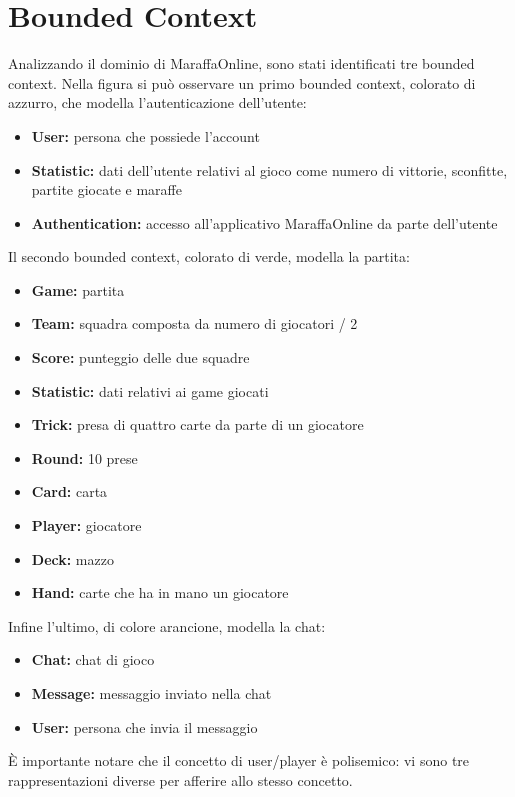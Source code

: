 \section{Bounded Context}
Analizzando il dominio di MaraffaOnline, sono stati identificati tre bounded context.
Nella figura si può osservare un primo bounded context, colorato di azzurro, che modella l'autenticazione dell'utente:
    \begin{itemize}
        \item \textbf{User:} persona che possiede l'account
        \item \textbf{Statistic:} dati dell'utente relativi al gioco come numero di vittorie, sconfitte, partite giocate e maraffe
        \item \textbf{Authentication:} accesso all'applicativo MaraffaOnline da parte dell'utente
    \end{itemize}
Il secondo bounded context, colorato di verde, modella la partita:
    \begin{itemize}
        \item \textbf{Game:} partita
        \item \textbf{Team:} squadra composta da numero di giocatori / 2
        \item \textbf{Score:} punteggio delle due squadre
        \item \textbf{Statistic:} dati relativi ai game giocati
        \item \textbf{Trick:} presa di quattro carte da parte di un giocatore
        \item \textbf{Round:} 10 prese
        \item \textbf{Card:} carta
        \item \textbf{Player:} giocatore
        \item \textbf{Deck:} mazzo
        \item \textbf{Hand:} carte che ha in mano un giocatore
    \end{itemize}
Infine l'ultimo, di colore arancione, modella la chat:
    \begin{itemize}
        \item \textbf{Chat:} chat di gioco
        \item \textbf{Message:} messaggio inviato nella chat
        \item \textbf{User:} persona che invia il messaggio
    \end{itemize}
È importante notare che il concetto di user/player è polisemico: vi sono tre rappresentazioni diverse per afferire allo stesso concetto.
